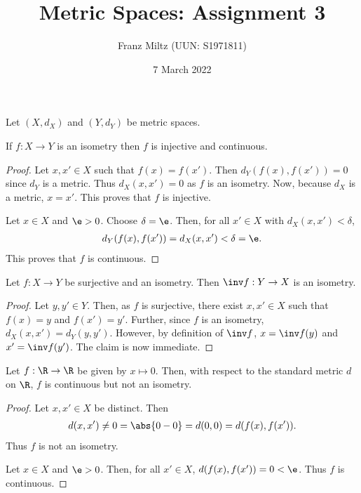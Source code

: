 \documentclass{article}
\begin{document}
\title{Metric Spaces: Assignment 3}
\author{Franz Miltz (UUN: S1971811)}
\date{7 March 2022}
\maketitle

Let $(X,d_X)$ and $(Y,d_Y)$ be metric spaces.

\begin{claim*}[1a]
   If $f:X\to Y$ is an isometry then $f$ is injective and continuous.
   \begin{proof}
      Let $x,x'\in X$ such that $f(x)=f(x')$. Then $d_Y(f(x),f(x'))=0$ since $d_Y$ is a metric.
      Thus $d_X(x,x')=0$ as $f$ is an isometry. Now, because $d_X$ is a metric, $x=x'$. This proves 
      that $f$ is injective.

      Let $x\in X$ and $\e>0$. Choose $\delta=\e$. Then, for all $x'\in X$ with $d_X(x,x')<\delta$, 
      \begin{align*}
         d_Y(f(x),f(x')) = d_X(x,x') < \delta = \e.
      \end{align*}
      This proves that $f$ is continuous.
   \end{proof}
\end{claim*}

\begin{claim*}[1b]
   Let $f:X\to Y$ be surjective and an isometry. Then $\inv f:Y\to X$ is an isometry.
   \begin{proof}
      Let $y,y'\in Y$. Then, as $f$ is surjective, there exist $x,x'\in X$ such that 
      $f(x)=y$ and $f(x')=y'$. Further, since $f$ is an isometry, $d_X(x,x')=d_Y(y,y')$.     
      However, by definition of $\inv f$, $x=\inv f(y)$ and $x'=\inv f(y')$. The claim is 
      now immediate.
   \end{proof}
\end{claim*}

\begin{claim*}[2]
   Let $f:\R\to \R$ be given by $x\mapsto 0$. Then, with respect to the standard metric 
   $d$ on $\R$, $f$ is continuous but not an isometry.
   \begin{proof}
      Let $x,x'\in X$ be distinct. Then 
      \begin{align*}
         d(x,x') \not= 0 = \abs{0-0} = d(0, 0) = d(f(x), f(x')).
      \end{align*}
      Thus $f$ is not an isometry.

      Let $x\in X$ and $\e>0$. Then, for all $x'\in X$, $d(f(x),f(x'))=0<\e$.
      Thus $f$ is continuous.
   \end{proof}
\end{claim*}
\end{document}
